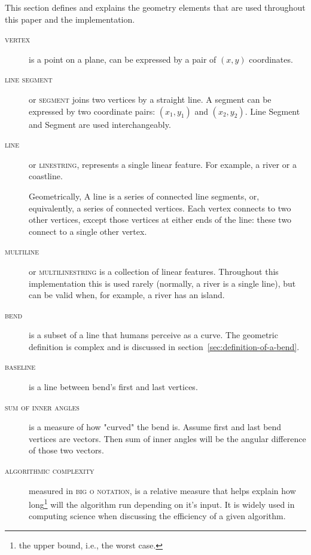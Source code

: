 \documentclass[a4paper]{article}
\begin{document}
This section defines and explains the geometry elements that are used
throughout this paper and the implementation.

\begin{description}

    \item[\normalfont\textsc{vertex}] is a point on a plane, can be expressed
        by a pair of $(x,y)$ coordinates.

    \item[\normalfont\textsc{line segment}] or \textsc{segment} joins two
        vertices by a straight line. A segment can be expressed by two
        coordinate pairs: $(x_1, y_1)$ and $(x_2, y_2)$. Line Segment and
        Segment are used interchangeably.

    \item[\normalfont\textsc{line}] or \textsc{linestring}, represents a single
        linear feature. For example, a river or a coastline.

        Geometrically, A line is a series of connected line segments, or,
        equivalently, a series of connected vertices. Each vertex connects to
        two other vertices, except those vertices at either ends of the line:
        these two connect to a single other vertex.

    \item[\normalfont\textsc{multiline}] or \textsc{multilinestring} is a
        collection of linear features. Throughout this implementation this is
        used rarely (normally, a river is a single line), but can be valid
        when, for example, a river has an island.

    \item[\normalfont\textsc{bend}] is a subset of a line that humans perceive
        as a curve. The geometric definition is complex and is discussed in
        section~\ref{sec:definition-of-a-bend}.

    \item[\normalfont\textsc{baseline}] is a line between bend's first and last
        vertices.

    \item[\normalfont\textsc{sum of inner angles}] is a measure of how "curved"
        the bend is. Assume first and last bend vertices are vectors. Then sum
        of inner angles will be the angular difference of those two vectors.

    \item[\normalfont\textsc{algorithmic complexity}] measured in \textsc{big o
        notation}, is a relative measure that helps explain how
        long\footnote{the upper bound, i.e., the worst case.} will the
        algorithm run depending on it's input. It is widely used in computing
        science when discussing the efficiency of a given algorithm.


\end{description}
\end{document}

